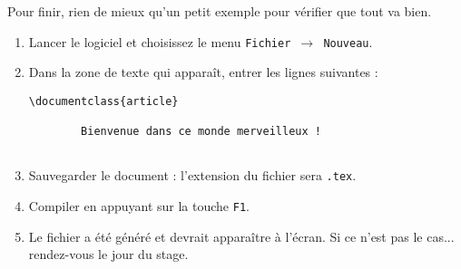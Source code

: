 Pour finir, rien de mieux qu'un petit exemple pour vérifier que tout va bien.
\begin{enumerate}
    \item Lancer le logiciel \texstudio et choisissez le menu {\tt Fichier $\rightarrow$ Nouveau}.
    \item Dans la zone de texte qui apparaît, entrer les lignes suivantes :


\begin{Verbatim}[label={[Premier test]{\sffamily Code A.1}},gobble=0]
    \documentclass{article}
    
        Bienvenue dans ce monde merveilleux !
    
\end{Verbatim}

%    
%    

    \item Sauvegarder le document : l'extension du fichier sera {\tt .tex}.
    \item Compiler en appuyant sur la touche {\tt F1}.
    \item Le fichier  a été généré et devrait apparaître à l'écran. Si ce n'est pas le cas... rendez-vous le jour du stage.
\end{enumerate} 
